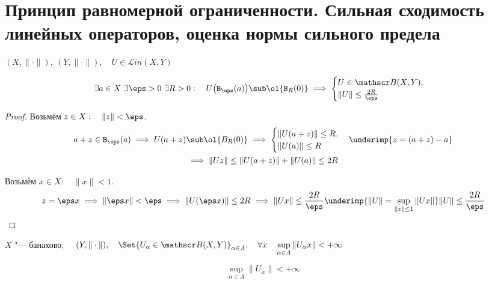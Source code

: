 \section
[Принцип равномерной ограниченности.
Сильная сходимость линейных операторов, \texorpdfstring{\\}{}
оценка нормы сильного предела]
{Принцип равномерной ограниченности.
Сильная сходимость линейных операторов, оценка нормы сильного предела}

\begin{lemma}
	$ (X, \|\cdot\|), ~ (Y, \|\cdot\|), \quad U \in \mathscr Lin(X, Y) $

	$$ \exists a \in X ~ \exists \eps > 0 ~ \exists R > 0 : \quad
	U \bigl( \mathtt B_\eps(a) \bigr) \sub \ol{\mathtt B_R(0)} \implies
	\begin{cases}
		U \in \mathscr B(X, Y), \\
		\|U\| \le \frac{2R}\eps
	\end{cases} $$
\end{lemma}

\begin{proof}
	Возьмём $ z \in X : \quad \|z\| < \eps $.
	\begin{multline*}
		a + z \in \mathtt B_\eps(a) \implies U (a + z) \sub \ol{B_R(0)} \implies
		\begin{cases}
			\|U(a + z)\| \le R, \\
			\|U(a)\| \le R
		\end{cases} \underimp{z = (a + z) - a} \\
		\implies \|Uz\| \le \|U(a + z)\| + \|U(a)\| \le 2R
	\end{multline*}

	Возьмём $ x \in X : \quad \|x\| < 1 $.
	$$ z = \eps x \implies \|\eps x\| < \eps \implies \|U(\eps x)\| \le 2R \implies
	\|Ux\| \le \frac{2R}\eps \underimp{\|U\| = \sup\limits_{\|x\| \le 1}\|Ux\|}
	\|U\| \le \frac{2R}\eps $$
\end{proof}

\begin{theorem}
	$ X $ "--- банахово, $ \quad (Y, \|\cdot\|), \quad
	\Set{U_\alpha \in \mathscr B(X, Y)}_{\alpha \in A}, \quad \forall x \quad
	\sup\limits_{\alpha \in A}\|U_\alpha x\| < +\infty $

	$$ \sup\limits_{\alpha \in A}\|U_\alpha\| < +\infty $$
\end{theorem}

